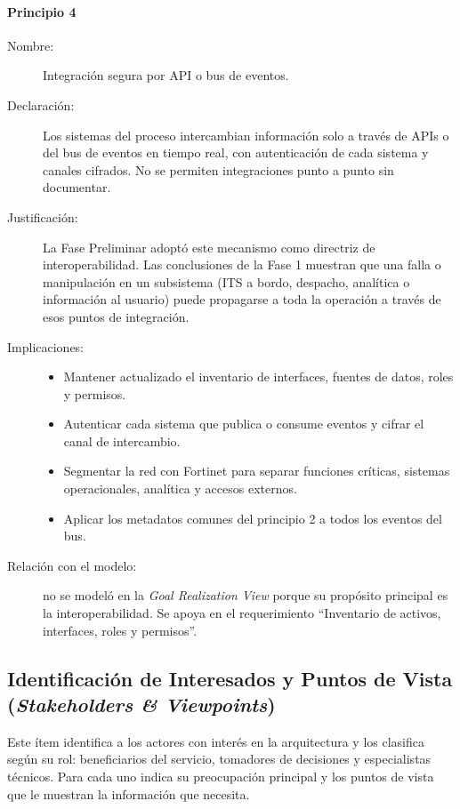\paragraph{Principio 4}
\begin{description}
	\item[Nombre:] Integración segura por API o bus de eventos.
	\item[Declaración:] Los sistemas del proceso intercambian información solo a través de APIs o del bus de eventos en tiempo real, con autenticación de cada sistema y canales cifrados. No se permiten integraciones punto a punto sin documentar.
	\item[Justificación:] La Fase Preliminar adoptó este mecanismo como directriz de interoperabilidad. Las conclusiones de la Fase 1 \parencite{fase1cci2026} muestran que una falla o manipulación en un subsistema (ITS a bordo, despacho, analítica o información al usuario) puede propagarse a toda la operación a través de esos puntos de integración.
	\item[Implicaciones:] \hfill
	      \begin{itemize}
		      \item Mantener actualizado el inventario de interfaces, fuentes de datos, roles y permisos.
		      \item Autenticar cada sistema que publica o consume eventos y cifrar el canal de intercambio.
		      \item Segmentar la red con Fortinet para separar funciones críticas, sistemas operacionales, analítica y accesos externos.
		      \item Aplicar los metadatos comunes del principio 2 a todos los eventos del bus.
	      \end{itemize}
	\item[Relación con el modelo:] no se modeló en la \textit{Goal Realization View} porque su propósito principal es la interoperabilidad. Se apoya en el requerimiento ``Inventario de activos, interfaces, roles y permisos''.
\end{description}

\subsection{Identificación de Interesados y Puntos de Vista (\textit{Stakeholders \& Viewpoints})}

Este ítem identifica a los actores con interés en la arquitectura y los clasifica según su rol: beneficiarios del servicio, tomadores de decisiones y especialistas técnicos. Para cada uno indica su preocupación principal y los puntos de vista que le muestran la información que necesita.

